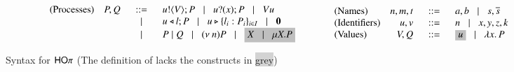 \begin{figure}[t!]
\[
	\begin{array}{lcl}
		\begin{array}{lrcl}
			\textrm{(Processes)}&
			P, Q	&\bnfis&	\bout{u}{V} P \bnfbar \binp{u}{x} P \bnfbar \appl{V}{u} \\
			&	&\bnfbar&	\bsel{u}{l} P \bnfbar \bbra{u}{l_i: P_i}_{i \in I} \bnfbar \inact\\
			&	&\bnfbar&	P \Par Q \bnfbar \news{n} P \bnfbar \nonhosyntax{\varp{X} \bnfbar  \recp{X}{P}}
		\end{array}
		&\quad &
		\begin{array}{lrcl}
			
			\textrm{(Names)}	& n, m, t	&\bnfis&	a, b \bnfbar s, \dual{s} \\
			\textrm{(Identifiers)}	& u, v		&\bnfis& 	n \bnfbar x, y, z, k \\
			\textrm{(Values)}	& V, Q		&\bnfis&	\nonhosyntax{u} \bnfbar \abs{x}{P}
		\end{array}
	\end{array}
\]
	\caption{Syntax for $\mathsf{HO}\pi$ (The definition of \HO lacks the constructs in \colorbox{lightgray}{grey}) \label{fig:syntax}}
\end{figure}

